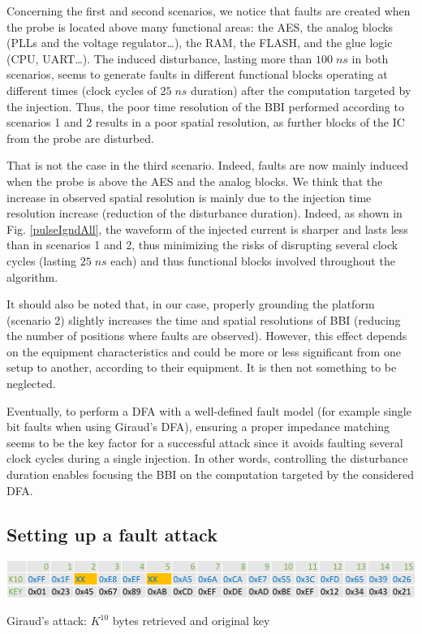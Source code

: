 \documentclass[10pt, conference, compsocconf]{IEEEtran}
\begin{document}
Concerning the first and second scenarios, we notice that faults are created when the probe is located above many functional areas: the AES, the analog blocks (PLLs and the voltage regulator…), the RAM, the FLASH, and the glue logic (CPU, UART…).
The induced disturbance, lasting more than $100 \; ns$ in both scenarios, seems to generate faults in different functional blocks operating at different times (clock cycles of $25 \; ns$ duration) after the computation targeted by the injection.
Thus, the poor time resolution of the BBI performed according to scenarios 1 and 2 results in a poor spatial resolution, as further blocks of the IC from the probe are disturbed.

That is not the case in the third scenario.
Indeed, faults are now mainly induced when the probe is above the AES and the analog blocks.
We think that the increase in observed spatial resolution is mainly due to the injection time resolution increase (reduction of the disturbance duration).
Indeed, as shown in Fig. \ref{pulseIgndAll}, the waveform of the injected current is sharper and lasts less than in scenarios 1 and 2, thus minimizing the risks of disrupting several clock cycles (lasting $25 \; ns$ each) and thus functional blocks involved throughout the algorithm.

It should also be noted that, in our case, properly grounding the platform (scenario 2) slightly increases the time and spatial resolutions of BBI (reducing the number of positions where faults are observed).
However, this effect depends on the equipment characteristics and could be more or less significant from one setup to another, according to their equipment.
It is then not something to be neglected.

Eventually, to perform a DFA with a well-defined fault model (for example single bit faults when using Giraud's DFA), ensuring a proper impedance matching seems to be the key factor for a successful attack since it avoids faulting several clock cycles during a single injection.
In other words, controlling the disturbance duration enables focusing the BBI on the computation targeted by the considered DFA.


\subsection{Setting up a fault attack}
\label{subsection:giraudAttack}

\begin{table}[!ht]
    \centering
    \includegraphics[width=\textwidth]{giraud__6N}
    \caption{Giraud's attack: $K^{10}$ bytes retrieved and original key}
    \label{giraudK10}
\end{table}
\end{document}
